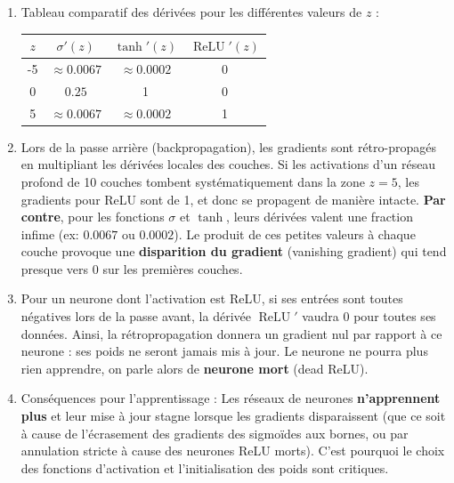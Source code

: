 \documentclass[]{../exercices}
\begin{document}
\begin{solution}
\begin{enumerate}
    \item Tableau comparatif des dérivées pour les différentes valeurs de $z$ :
    \begin{table}[h]
        \centering
        \begin{tabular}{|c|c|c|c|}
            \hline
            $z$ & $\sigma'(z)$ & $\tanh'(z)$ & $\operatorname{ReLU}'(z)$ \\
            \hline
            -5 & $\approx 0.0067$ & $\approx 0.0002$ & 0 \\
            \hline
            0 & $0.25$ & 1 & 0 \\
            \hline
            5 & $\approx 0.0067$ & $\approx 0.0002$ & 1 \\
            \hline
        \end{tabular}
    \end{table}

    \item Lors de la passe arrière (backpropagation), les gradients sont rétro-propagés en multipliant les dérivées locales des couches. Si les activations d'un réseau profond de 10 couches tombent systématiquement dans la zone $z=5$, les gradients pour ReLU sont de 1, et donc se propagent de manière intacte. \textbf{Par contre}, pour les fonctions $\sigma$ et $\tanh$, leurs dérivées valent une fraction infime (ex: $0.0067$ ou $0.0002$). Le produit de ces petites valeurs à chaque couche provoque une \textbf{disparition du gradient} (vanishing gradient) qui tend presque vers $0$ sur les premières couches.

    \item Pour un neurone dont l'activation est ReLU, si ses entrées sont toutes négatives lors de la passe avant, la dérivée $\operatorname{ReLU}'$ vaudra 0 pour toutes ses données. Ainsi, la rétropropagation donnera un gradient nul par rapport à ce neurone : ses poids ne seront jamais mis à jour. Le neurone ne pourra plus rien apprendre, on parle alors de \textbf{neurone mort} (dead ReLU).

    \item Conséquences pour l'apprentissage : Les réseaux de neurones \textbf{n'apprennent plus} et leur mise à jour stagne lorsque les gradients disparaissent (que ce soit à cause de l'écrasement des gradients des sigmoïdes aux bornes, ou par annulation stricte à cause des neurones ReLU morts). C'est pourquoi le choix des fonctions d'activation et l'initialisation des poids sont critiques.
\end{enumerate}
\end{solution}
\end{document}
